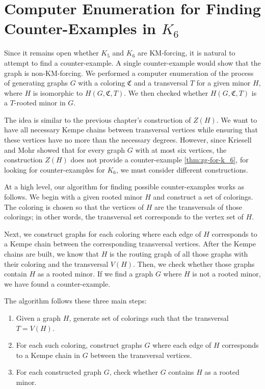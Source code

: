 \chapter{Computer Enumeration for Finding Counter-Examples in \( K_6 \)}
\label{chap:enumeration}

Since it remains open whether \( K_5 \) and \( K_6 \) are KM-forcing, it is natural to attempt to find a counter-example.
A single counter-example would show that the graph is non-KM-forcing.
We performed a computer enumeration of the process of generating graphs \( G \) with a coloring \( \mathfrak{C} \) and a transversal \( T \) for a given minor \( H \),
where \( H \) is isomorphic to \( H(G, \mathfrak{C}, T) \). We then checked whether \( H(G, \mathfrak{C}, T) \) is a $T$-rooted minor in \( G \).

The idea is similar to the previous chapter's construction of \( Z(H) \). 
We want to have all necessary Kempe chains between transversal vertices while ensuring that these vertices have no more than the necessary degrees.
However, since Kriesell and Mohr \cite{matthias_2022} showed that for every graph \( G \) with at most six vertices, the construction \( Z(H) \) does not
provide a counter-example \ref{thm:zg-for-k_6}, for looking for counter-examples 
for $K_6$, we must consider different constructions.

At a high level, our algorithm for finding possible counter-examples works as follows.
We begin with a given rooted minor \( H \) and construct a set of colorings.
The coloring is chosen so that the vertices of \( H \) are the transversals of those colorings; in other words, the transversal set corresponds to the vertex set of \( H \). 

Next, we construct graphs for each coloring where each edge of $H$ corresponds to a Kempe chain between the corresponding transversal vertices. After the Kempe chains are built, 
we know that \( H \) is the routing graph of all those graphs with their coloring and the transversal $V(H)$. 
Then, we check whether those graphs contain \( H \) as a rooted minor. 
If we find a graph \( G \) where \( H \) is not a rooted minor, we have found a counter-example.

The algorithm follows these three main steps:
\begin{enumerate}
    \item Given a graph \( H \), generate set of colorings such that the transversal \( T = V(H) \).
    \item For each such coloring, construct graphs $G$ where each edge of $H$ corresponds to a Kempe chain in $G$ between the transversal vertices.
    \item For each constructed graph \( G \), check whether \( G \) contains \( H \) as a rooted minor.
\end{enumerate}

